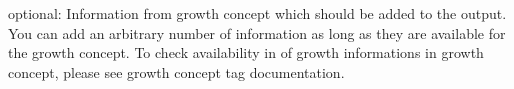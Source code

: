 optional\+: Information from growth concept which should be added to the output. You can add an arbitrary number of information as long as they are available for the growth concept. To check availability in of growth informations in growth concept, please see growth concept tag documentation. 